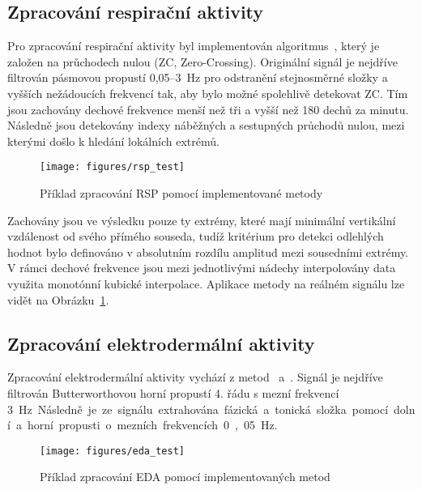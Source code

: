 \subsection{Zpracování respirační aktivity}
\label{subsec:zpracovani_rsp}
Pro zpracování respirační aktivity byl implementován
algoritmus~\cite{Khodadad2018}, který je založen na průchodech nulou (\gls{ZC},
Zero-Crossing). Originální signál je nejdříve filtrován pásmovou propustí
0,05--3~Hz pro odstranění stejnosměrné složky a vyšších nežádoucích frekvencí
tak, aby bylo možné spolehlivě detekovat \gls{ZC}. Tím jsou zachovány dechové
frekvence menší než tři a vyšší než 180 dechů za minutu. Následně jsou
detekovány indexy náběžných a sestupných průchodů nulou, mezi kterými došlo k
hledání lokálních extrémů.

\begin{figure}[h]
    \begin{center}
        \texttt{[image: figures/rsp\_test]}
        \caption{Příklad zpracování RSP pomocí implementované metody}
        \label{fig:rsp_test}
    \end{center}
\end{figure}

Zachovány jsou ve výsledku pouze ty extrémy, které mají minimální vertikální
vzdálenost od svého přímého souseda, tudíž kritérium pro detekci odlehlých
hodnot bylo definováno v absolutním rozdílu amplitud mezi sousedními extrémy. V
rámci dechové frekvence jsou mezi jednotlivými nádechy interpolovány data
využita monotónní kubické interpolace. Aplikace metody na reálném signálu lze
vidět na Obrázku~\ref{fig:rsp_test}.

\subsection{Zpracování elektrodermální aktivity}
\label{subsec:zpracovani_eda}
Zpracování elektrodermální aktivity vychází z metod~\cite{vanhalem2020}
a~\cite{posada2016}. Signál je nejdříve filtrován Butterworthovou horní propustí
4. řádu s mezní frekvencí 3~\si\Hz. Následně je ze signálu extrahována fázická a
tonická složka pomocí dolní a horní propusti o mezních frekvencích 0,05~\si\Hz.

\begin{figure}[h]
    \begin{center}
        \texttt{[image: figures/eda\_test]}
        \caption{Příklad zpracování EDA pomocí implementovaných metod}
        \label{fig:eda_test}
    \end{center}
\end{figure}

